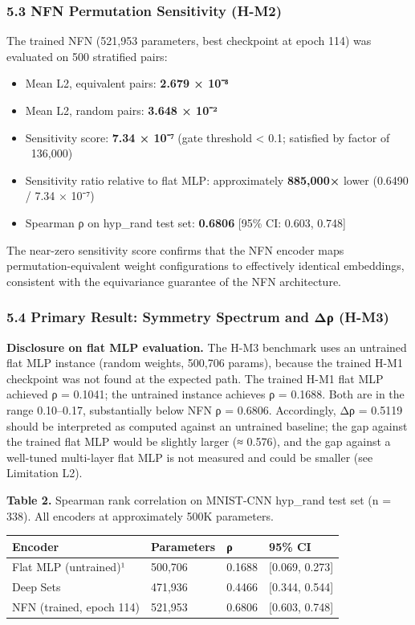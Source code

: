 \subsubsection{5.3 NFN Permutation Sensitivity (H-M2)}

The trained NFN (521,953 parameters, best checkpoint at epoch 114) was evaluated on 500 stratified pairs:

\begin{itemize}
\item Mean L2, equivalent pairs: \textbf{2.679 × 10⁻⁸}
\item Mean L2, random pairs: \textbf{3.648 × 10⁻²}
\item Sensitivity score: \textbf{7.34 × 10⁻⁷} (gate threshold < 0.1; satisfied by factor of ~136,000)
\item Sensitivity ratio relative to flat MLP: approximately \textbf{885,000×} lower (0.6490 / 7.34 × 10⁻⁷)
\item Spearman ρ on hyp_rand test set: \textbf{0.6806} [95\% CI: 0.603, 0.748]
\end{itemize}

The near-zero sensitivity score confirms that the NFN encoder maps permutation-equivalent weight configurations to effectively identical embeddings, consistent with the equivariance guarantee of the NFN architecture.

\subsubsection{5.4 Primary Result: Symmetry Spectrum and Δρ (H-M3)}

\textbf{Disclosure on flat MLP evaluation.} The H-M3 benchmark uses an untrained flat MLP instance (random weights, 500,706 params), because the trained H-M1 checkpoint was not found at the expected path. The trained H-M1 flat MLP achieved ρ = 0.1041; the untrained instance achieves ρ = 0.1688. Both are in the range 0.10–0.17, substantially below NFN ρ = 0.6806. Accordingly, Δρ = 0.5119 should be interpreted as computed against an untrained baseline; the gap against the trained flat MLP would be slightly larger (≈ 0.576), and the gap against a well-tuned multi-layer flat MLP is not measured and could be smaller (see Limitation L2).

\textbf{Table 2.} Spearman rank correlation on MNIST-CNN hyp_rand test set (n = 338). All encoders at approximately 500K parameters.

\begin{table}[htbp]
\centering
\begin{tabular}{llll}
\toprule
Encoder & Parameters & ρ & 95\% CI \\
\midrule
Flat MLP (untrained)¹ & 500,706 & 0.1688 & [0.069, 0.273] \\
Deep Sets & 471,936 & 0.4466 & [0.344, 0.544] \\
NFN (trained, epoch 114) & 521,953 & 0.6806 & [0.603, 0.748] \\
\bottomrule
\end{tabular}
\end{table}

